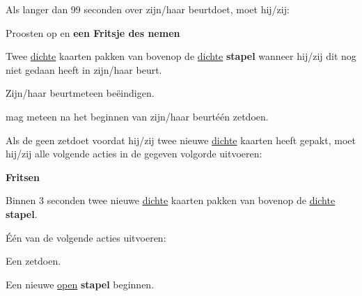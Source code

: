\newpage
{}
\label{sec:beurten_en_zetten_start}


\vervolgLijst{}
    \item Als \eenSpeler langer dan 99 seconden over zijn/haar beurt\footnotemark[1] doet, moet hij/zij:
    \puntLijst{}
        \item Proosten op  en \textbf{een Fritsje des nemen}\footnotemark[2]
        \item Twee \ul{dichte} kaarten pakken van bovenop de \ul{dichte} \textbf{stapel} wanneer hij/zij dit nog niet gedaan heeft in zijn/haar beurt.
        \item Zijn/haar beurt\footnotemark[1] meteen beëindigen.
    \eindPuntLijst{}
    \label{regel:beurt_langer_dan_99}
\eindLijst{}


\vervolgLijst{}
    \item \EenSpeler mag meteen na het beginnen van zijn/haar beurt\footnotemark[1] \'e\'en zet\footnotemark[3] doen.
\eindLijst{}

\vervolgLijst{}
    \item \label{regel:twee_kaarten} Als de \huidigeSpeler geen zet\footnotemark[3] doet voordat hij/zij twee nieuwe \ul{dichte} kaarten heeft gepakt, moet hij/zij alle volgende acties in de gegeven volgorde uitvoeren:
    \puntLijst{}
        \item \textbf{Fritsen}
        \item Binnen 3 seconden twee nieuwe \ul{dichte} kaarten pakken van bovenop de \ul{dichte} \textbf{stapel}.
        \item Één van de volgende acties uitvoeren:
        \numeriekeLijst{}
            \item Een zet\footnotemark[3] doen.
            \item Een nieuwe \ul{open} \textbf{stapel} beginnen.
        \eindNumeriekeLijst{}
     \eindPuntLijst{}
\eindLijst{}

